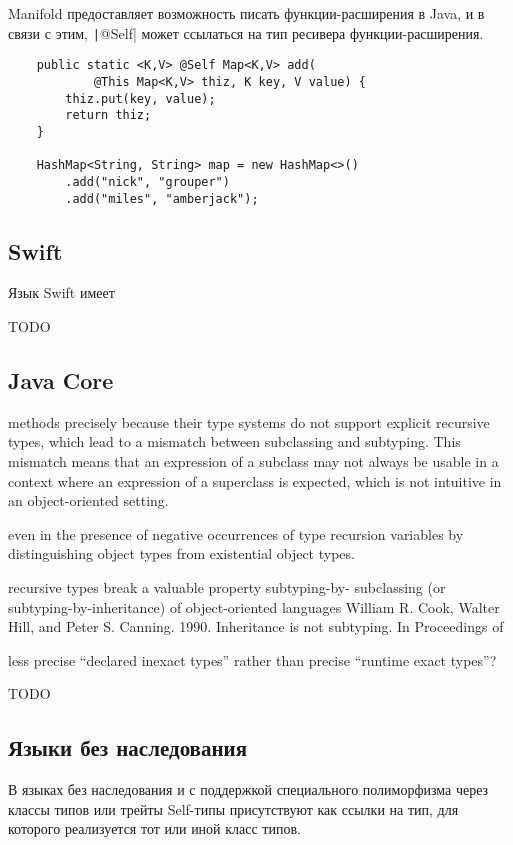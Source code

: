 Manifold предоставляет возможность писать функции-расширения в Java, и в связи с этим, \texttt|@Self| может ссылаться на тип ресивера функции-расширения.

\begin{verbatim}
    public static <K,V> @Self Map<K,V> add(
            @This Map<K,V> thiz, K key, V value) {
        thiz.put(key, value);
        return thiz;
    }

    HashMap<String, String> map = new HashMap<>()
        .add("nick", "grouper")
        .add("miles", "amberjack");
\end{verbatim}

\subsection{Swift}

Язык Swift имеет

TODO %

\subsection{Java Core}

methods precisely because their type systems
do not support explicit recursive types, which lead to a mismatch between subclassing and subtyping. This
mismatch means that an expression of a subclass may not always be usable in a context where an expression
of a superclass is expected, which is not intuitive in an object-oriented setting.

even in the presence of negative occurrences of type
recursion variables by distinguishing object types from existential object types.

recursive types break a valuable property subtyping-by-
subclassing (or subtyping-by-inheritance) of object-oriented languages
William R. Cook, Walter Hill, and Peter S. Canning. 1990. Inheritance is not subtyping. In Proceedings of

less precise “declared inexact types” rather than precise “runtime
exact types”?

TODO %

\cite{ryu2016thistype}



\subsection{Языки без наследования}

В языках без наследования и с поддержкой специального полиморфизма через классы типов или трейты Self-типы присутствуют как ссылки на тип, для которого реализуется тот или иной класс типов.

